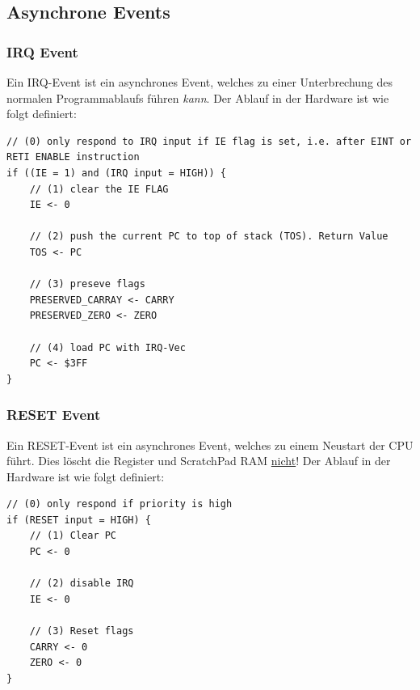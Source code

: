 \subsection{Asynchrone Events}
\subsubsection{IRQ Event}
Ein IRQ-Event ist ein asynchrones Event, welches zu einer Unterbrechung des normalen Programmablaufs führen \textit{kann}. Der Ablauf in der Hardware ist wie folgt definiert:
\begin{lstlisting}
// (0) only respond to IRQ input if IE flag is set, i.e. after EINT or RETI ENABLE instruction
if ((IE = 1) and (IRQ input = HIGH)) {
	// (1) clear the IE FLAG
	IE <- 0
		
	// (2) push	the current PC to top of stack (TOS). Return Value
	TOS <- PC
		
	// (3) preseve flags
	PRESERVED_CARRAY <- CARRY
	PRESERVED_ZERO <- ZERO
		
	// (4) load PC with IRQ-Vec
	PC <- $3FF
}
\end{lstlisting}

\subsubsection{RESET Event}
Ein RESET-Event ist ein asynchrones Event, welches zu einem Neustart der CPU führt. Dies löscht die Register und ScratchPad RAM \underline{nicht}! Der Ablauf in der Hardware ist wie folgt definiert:
\begin{lstlisting}
// (0) only respond if priority is high
if (RESET input = HIGH) {
	// (1) Clear PC
	PC <- 0
	
	// (2) disable IRQ
	IE <- 0
		
	// (3) Reset flags
	CARRY <- 0
	ZERO <- 0
}
\end{lstlisting}